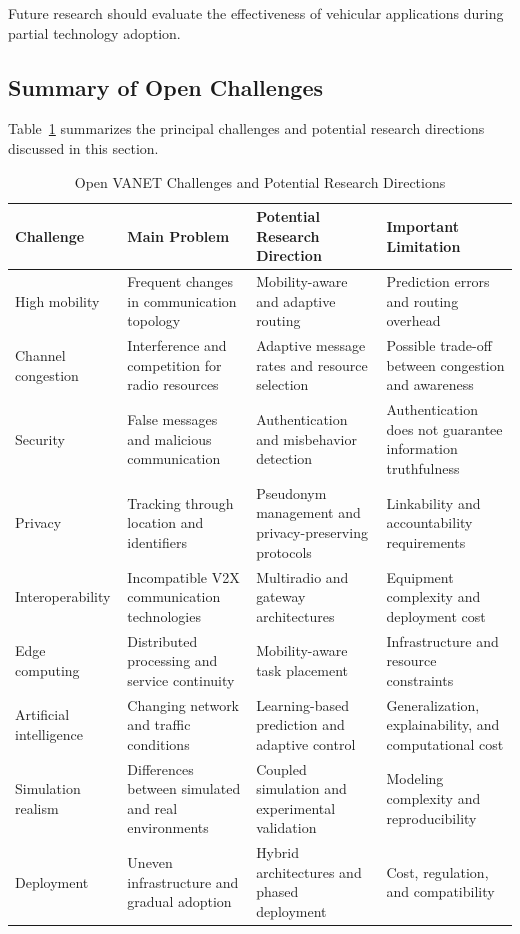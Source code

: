 Future research
should evaluate
the effectiveness
of vehicular
applications during
partial technology
adoption.

\subsection{Summary of Open Challenges}

Table~\ref{tab:future_challenges}
summarizes the
principal challenges
and potential
research directions
discussed in
this section.

\begin{table}[t]
\centering
\caption{Open VANET Challenges and Potential Research Directions}
\label{tab:future_challenges}
\scriptsize
\begin{tabular}{|p{2.8cm}|p{4.0cm}|p{4.1cm}|p{4.1cm}|}
\hline
\textbf{Challenge} &
\textbf{Main Problem} &
\textbf{Potential Research Direction} &
\textbf{Important Limitation} \\
\hline
High mobility &
Frequent changes in communication topology &
Mobility-aware and adaptive routing &
Prediction errors and routing overhead \\
\hline
Channel congestion &
Interference and competition for radio resources &
Adaptive message rates and resource selection &
Possible trade-off between congestion and awareness \\
\hline
Security &
False messages and malicious communication &
Authentication and misbehavior detection &
Authentication does not guarantee information truthfulness \\
\hline
Privacy &
Tracking through location and identifiers &
Pseudonym management and privacy-preserving protocols &
Linkability and accountability requirements \\
\hline
Interoperability &
Incompatible V2X communication technologies &
Multiradio and gateway architectures &
Equipment complexity and deployment cost \\
\hline
Edge computing &
Distributed processing and service continuity &
Mobility-aware task placement &
Infrastructure and resource constraints \\
\hline
Artificial intelligence &
Changing network and traffic conditions &
Learning-based prediction and adaptive control &
Generalization, explainability, and computational cost \\
\hline
Simulation realism &
Differences between simulated and real environments &
Coupled simulation and experimental validation &
Modeling complexity and reproducibility \\
\hline
Deployment &
Uneven infrastructure and gradual adoption &
Hybrid architectures and phased deployment &
Cost, regulation, and compatibility \\
\hline
\end{tabular}
\end{table}

